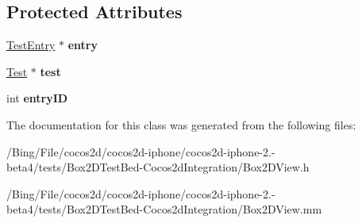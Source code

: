 \subsection*{Protected Attributes}
\begin{DoxyCompactItemize}
\item 
\hypertarget{interface_box2_d_view_a167b273fc5916ea1f371509747651be2}{\hyperlink{struct_test_entry}{Test\-Entry} $\ast$ {\bfseries entry}}\label{interface_box2_d_view_a167b273fc5916ea1f371509747651be2}

\item 
\hypertarget{interface_box2_d_view_a932a58299def598c3754df6901f267ea}{\hyperlink{class_test}{Test} $\ast$ {\bfseries test}}\label{interface_box2_d_view_a932a58299def598c3754df6901f267ea}

\item 
\hypertarget{interface_box2_d_view_a3656df2311a51c3c66b088357dad9f30}{int {\bfseries entry\-I\-D}}\label{interface_box2_d_view_a3656df2311a51c3c66b088357dad9f30}

\end{DoxyCompactItemize}


The documentation for this class was generated from the following files\-:\begin{DoxyCompactItemize}
\item 
/\-Bing/\-File/cocos2d/cocos2d-\/iphone/cocos2d-\/iphone-\/2.-\/beta4/tests/\-Box2\-D\-Test\-Bed-\/\-Cocos2d\-Integration/Box2\-D\-View.\-h\item 
/\-Bing/\-File/cocos2d/cocos2d-\/iphone/cocos2d-\/iphone-\/2.-\/beta4/tests/\-Box2\-D\-Test\-Bed-\/\-Cocos2d\-Integration/Box2\-D\-View.\-mm\end{DoxyCompactItemize}
